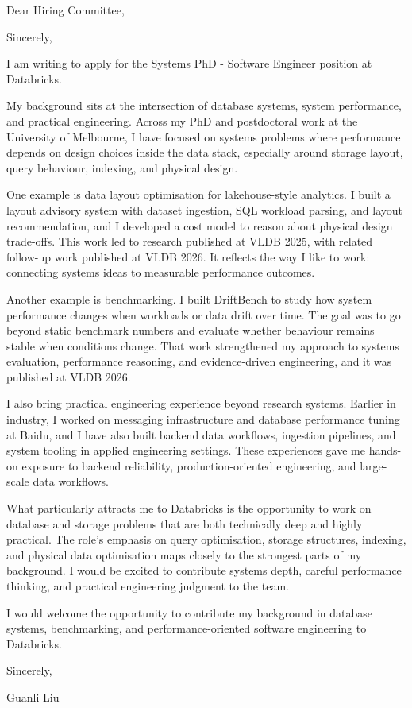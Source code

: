 \documentclass[11pt,a4paper]{moderncv}
\begin{document}
\date{\today}
\opening{Dear Hiring Committee,}
\closing{Sincerely,}
\makelettertitle

I am writing to apply for the Systems PhD - Software Engineer position at Databricks.

My background sits at the intersection of database systems, system performance, and practical engineering. Across my PhD and postdoctoral work at the University of Melbourne, I have focused on systems problems where performance depends on design choices inside the data stack, especially around storage layout, query behaviour, indexing, and physical design.

One example is data layout optimisation for lakehouse-style analytics. I built a layout advisory system with dataset ingestion, SQL workload parsing, and layout recommendation, and I developed a cost model to reason about physical design trade-offs. This work led to research published at VLDB 2025, with related follow-up work published at VLDB 2026. It reflects the way I like to work: connecting systems ideas to measurable performance outcomes.

Another example is benchmarking. I built DriftBench to study how system performance changes when workloads or data drift over time. The goal was to go beyond static benchmark numbers and evaluate whether behaviour remains stable when conditions change. That work strengthened my approach to systems evaluation, performance reasoning, and evidence-driven engineering, and it was published at VLDB 2026.

I also bring practical engineering experience beyond research systems. Earlier in industry, I worked on messaging infrastructure and database performance tuning at Baidu, and I have also built backend data workflows, ingestion pipelines, and system tooling in applied engineering settings. These experiences gave me hands-on exposure to backend reliability, production-oriented engineering, and large-scale data workflows.

What particularly attracts me to Databricks is the opportunity to work on database and storage problems that are both technically deep and highly practical. The role's emphasis on query optimisation, storage structures, indexing, and physical data optimisation maps closely to the strongest parts of my background. I would be excited to contribute systems depth, careful performance thinking, and practical engineering judgment to the team.

I would welcome the opportunity to contribute my background in database systems, benchmarking, and performance-oriented software engineering to Databricks.

\vspace{1cm}

Sincerely,

\vspace{0.5cm}

Guanli Liu
\end{document}
